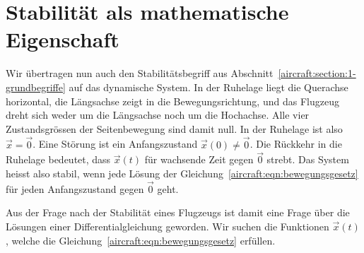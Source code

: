 %
%
%

\section{Stabilität als mathematische Eigenschaft
\label{aircraft:section:3-mathematische-stabilitaet}}
Wir übertragen nun auch den Stabilitätsbegriff aus
Abschnitt~\ref{aircraft:section:1-grundbegriffe} auf das dynamische System.
In der Ruhelage liegt die Querachse horizontal, die Längsachse zeigt in die
Bewegungsrichtung, und das Flugzeug dreht sich weder um die Längsachse noch
um die Hochachse.
Alle vier Zustandsgrössen der Seitenbewegung sind damit null.
In der Ruhelage ist also $\vec{x} = \vec{0}$.
Eine Störung ist ein Anfangszustand $\vec{x}(0) \neq \vec{0}$.
Die Rückkehr in die Ruhelage bedeutet, dass $\vec{x}(t)$ für
wachsende Zeit gegen $\vec{0}$ strebt.
Das System heisst also stabil, wenn jede Lösung der
Gleichung~\eqref{aircraft:eqn:bewegungsgesetz} für jeden
Anfangszustand gegen $\vec{0}$ geht.

Aus der Frage nach der Stabilität eines Flugzeugs ist damit eine
Frage über die Lösungen einer Differentialgleichung geworden.
Wir suchen die Funktionen $\vec{x}(t)$, welche die
Gleichung~\eqref{aircraft:eqn:bewegungsgesetz} erfüllen.

